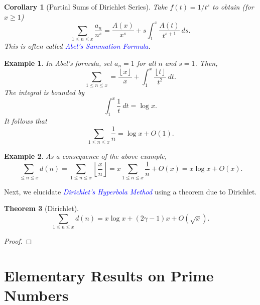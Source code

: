 \documentclass[12pt]{article}
\theoremstyle{thmstyle}
\newtheorem{theorem}{Theorem}[section]
\theoremstyle{defstyle}
\newtheorem*{corollary}{Corollary}
\newtheorem{example}[theorem]{Example}
\newcommand{\define}[1]{\textcolor{blue}{\textit{#1}}}
\renewcommand{\le}{\leqslant}
\renewcommand{\ge}{\geqslant}
\newcommand{\floor}[1]{\left\lfloor #1\right\rfloor}
\begin{document}
\begin{corollary}[Partial Sums of Dirichlet Series]
    Take $f(t) = 1/t^s$ to obtain (for $x\ge 1$)
    \begin{equation*}
        \sum_{1\le n\le x}\frac{a_n}{n^s} = \frac{A(x)}{x^s} + s\int_1^x\frac{A(t)}{t^{s + 1}}~ds.
    \end{equation*}
    This is often called \define{Abel's Summation Formula}.
\end{corollary}

\begin{example}
    In Abel's formula, set $a_n = 1$ for all $n$ and $s = 1$. Then, 
    \begin{equation*}
        \sum_{1\le n\le x} = \frac{\floor x}{x} + \int_1^x \frac{\floor t}{t^2}~dt.
    \end{equation*}
    The integral is bounded by 
    \begin{equation*}
        \int_1^x\frac{1}{t}~dt = \log x.
    \end{equation*}
    It follows that 
    \begin{equation*}
        \sum_{1\le n\le x}\frac{1}{n} = \log x + O(1).
    \end{equation*}
\end{example}

\begin{example}
    As a consequence of the above example, 
    \begin{equation*}
        \sum_{\le n\le x} d(n) = \sum_{1\le n\le x}\floor{\frac{x}{n}} = x\sum_{1\le n\le x}\frac{1}{n} + O(x) = x\log x + O(x).
    \end{equation*}
\end{example}

Next, we elucidate \define{Dirichlet's Hyperbola Method} using a theorem due to Dirichlet.

\begin{theorem}[Dirichlet]
    \begin{equation*}
        \sum_{1\le n\le x} d(n) = x\log x + (2\gamma - 1)x + O(\sqrt x).
    \end{equation*}
\end{theorem}
\begin{proof}
\end{proof}

\section{Elementary Results on Prime Numbers}
\end{document}
